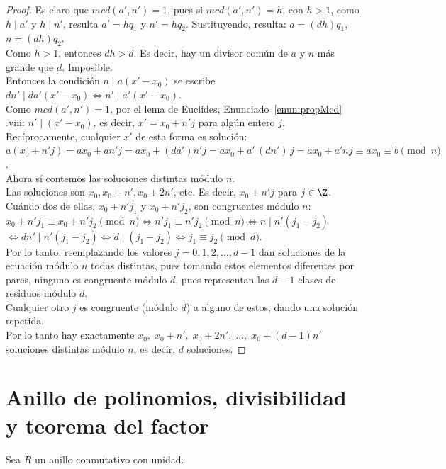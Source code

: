 \begin{proof}
Es claro que $mcd(a',n')=1$, pues si $mcd(a',n')=h$, con $h>1$, como $h \mid a'$ y $h \mid n'$, resulta $a'=hq_1$ y $n'=hq_2$. Sustituyendo, resulta: $a=(dh)q_1$, $n=(dh)q_2$. \\
Como $h > 1$, entonces $dh > d$. Es decir, hay un divisor común de $a$ y $n$ más grande que $d$. Imposible.  \\
Entonces la condición $n \mid a(x'-x_0)$ se escribe $dn' \mid da'(x'-x_0) \iff n' \mid a'(x'-x_0)$. \\
Como $mcd(a',n')=1$, por el lema de Euclides, Enunciado~\ref{enun:propMcd}
.viii: $n' \mid (x'-x_0)$, 
es decir, $x' = x_0 + n' j$ para algún entero $j$. \\
Recíprocamente, cualquier $x'$ de esta forma es solución: \\
$a(x_0+n'j) = ax_0 + an'j = ax_0 + (da')n' j = ax_0 + a'\,(dn')\,j = ax_0 + a' n j\equiv ax_0\equiv b\pmod n$. \\
Ahora sí contemos las soluciones distintas módulo $n$. \\
Las soluciones son $x_0, x_0+n', x_0+2n'$, etc. Es decir, $x_0 + n'j$ para $j \in \Z$. \\
Cuándo dos de ellas, $x_0+n'j_1$ y $x_0+n'j_2$, son congruentes módulo $n$: \\
$x_0+n'j_1 \equiv x_0+n'j_2 \pmod n \iff n'j_1 \equiv n'j_2 \pmod n \iff n \mid n'(j_1-j_2)$ \\
$\iff dn'\mid n'(j_1-j_2) \iff d\mid (j_1-j_2) \iff j_1 \equiv j_2 \pmod d$. \\
Por lo tanto, reemplazando los valores $j=0,1,2,\dots,d-1$ dan soluciones de la ecuación módulo $n$ todas distintas, pues tomando estos elementos diferentes por pares, ninguno es congruente módulo $d$, pues representan las $d-1$ clases de residuos módulo $d$. \\
Cualquier otro $j$ es congruente (módulo $d$) a alguno de estos, dando una solución repetida. \\
Por lo tanto hay exactamente $x_0,\; x_0+n',\; x_0+2n',\;\dots,\; x_0+(d-1)n'$ soluciones distintas módulo $n$, es decir, $d$ soluciones.
\end{proof}

\section{Anillo de polinomios, divisibilidad y teorema del factor}
\label{sec:polinomios}
Sea $R$ un anillo conmutativo con unidad. 

